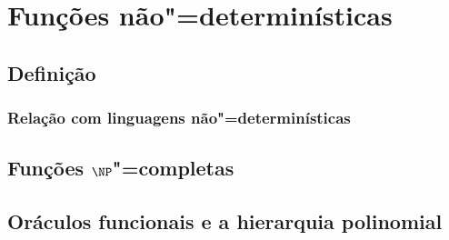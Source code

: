 \chapter{Funções não"=determinísticas}



\section{Definição}
\subsection{Relação com linguagens não"=determinísticas}
\section{Funções $\NP$"=completas}
\section{Oráculos funcionais e a hierarquia polinomial}

